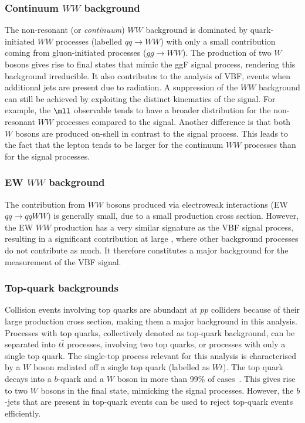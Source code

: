 \subsubsection{Continuum $WW$ background}
The non-resonant (or \emph{continuum}) $WW$ background is dominated by quark-initiated $WW$ processes (labelled $qq \to WW$) with only a small contribution coming from gluon-initiated processes ($gg \to WW$). 
The production of two $W$ bosons gives rise to final states that mimic the ggF signal process, rendering this background irreducible. 
It also contributes to the analysis of VBF, \HWW events when additional jets are present due to radiation. 
A suppression of the $WW$ background can still be achieved by exploiting the distinct kinematics of the signal. For example, the $\mll$ observable tends to have a broader distribution for the non-resonant $WW$ processes compared to the signal. 
Another difference is that both $W$ bosons are produced on-shell in contrast to the signal process. 
This leads to the fact that the lepton \pT tends to be larger for the continuum $WW$ processes than for the signal processes.


\subsubsection{EW $WW$ background}
The contribution from $WW$ bosons produced via electroweak interactions (EW $qq \to qqWW$) is generally small, due to a small production cross section. However, the EW $WW$ production has a very similar signature as the VBF signal process, resulting in a significant contribution at large \mjj, where other background processes do not contribute as much. 
It therefore constitutes a major background for the measurement of the VBF signal. 

\subsubsection{Top-quark backgrounds}
Collision events involving top quarks are abundant at $pp$ colliders because of their large production cross section, making them a major background in this analysis.
Processes with top quarks, collectively denoted as top-quark background, can be separated into $t\bar{t}$ processes, involving two top quarks, or processes with only a single top quark. 
The single-top process relevant for this analysis is characterised by a $W$ boson radiated off a single top quark (labelled as $Wt$). 
The top quark decays into a $b$-quark and a $W$ boson in more than 99\% of cases~\cite{PDG2020}. 
This gives rise to two $W$ bosons in the final state, mimicking the signal processes. 
However, the $b$-jets that are present in top-quark events can be used to reject top-quark events efficiently.


